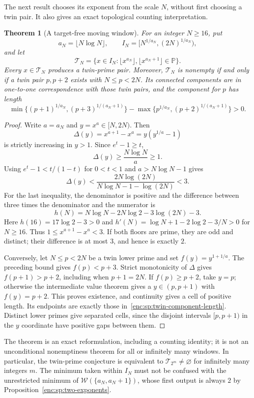 \documentclass[11pt,a4paper]{article}
\newtheorem{theorem}{Theorem}[section]
\theoremstyle{definition}
\theoremstyle{remark}
\numberwithin{equation}{section}
\begin{document}
The next result chooses its exponent from the scale $N$, without first
choosing a twin pair. It also gives an exact topological counting
interpretation.
\begin{theorem}[A target-free moving window]\label{enc:sp:moving-window}
For an integer $N\ge16$, put
\[
 a_N=\lfloor N\log N\rfloor,\qquad
 I_N=[N^{1/a_N},(2N)^{1/a_N}),
\]
and let
\[
 \mathcal T_N=\{x\in I_N:\lfloor x^{a_N}\rfloor,
                         \lfloor x^{a_N+1}\rfloor\in\mathbb P\}.
\]
Every $x\in\mathcal T_N$ produces a twin-prime pair. Moreover,
$\mathcal T_N$ is nonempty if and only if a twin pair $p,p+2$ exists with
$N\le p<2N$. Its connected components are in one-to-one correspondence
with those twin pairs, and the component for $p$ has length
\begin{equation}\label{enc:sp:twin-component-length}
 \min\{(p+1)^{1/a_N},(p+3)^{1/(a_N+1)}\}
 -\max\{p^{1/a_N},(p+2)^{1/(a_N+1)}\}>0.
\end{equation}
\end{theorem}
\begin{proof}
Write $a=a_N$ and $y=x^a\in[N,2N)$. Then
\[
 \Delta(y)=x^{a+1}-x^a=y(y^{1/a}-1)
\]
is strictly increasing in $y>1$. Since $e^t-1\ge t$,
\[
 \Delta(y)\ge\frac{N\log N}{a}\ge1.
\]
Using $e^t-1<t/(1-t)$ for $0<t<1$ and $a>N\log N-1$ gives
\[
 \Delta(y)<
 \frac{2N\log(2N)}{N\log N-1-\log(2N)}<3.
\]
For the last inequality, the denominator is positive and the difference
between three times the denominator and the numerator is
\[
 h(N)=N\log N-2N\log2-3\log(2N)-3.
\]
Here $h(16)=17\log2-3>0$ and
$h'(N)=\log N+1-2\log2-3/N>0$ for $N\ge16$.
Thus $1\le x^{a+1}-x^a<3$. If both floors are prime, they are odd and
distinct; their difference is at most $3$, and hence is exactly $2$.

Conversely, let $N\le p<2N$ be a twin lower prime and set
$f(y)=y^{1+1/a}$. The preceding bound gives $f(p)<p+3$.
Strict monotonicity of $\Delta$ gives
$f(p+1)>p+2$, including when $p+1=2N$. If $f(p)\ge p+2$, take $y=p$;
otherwise the intermediate value theorem gives a
$y\in(p,p+1)$ with $f(y)=p+2$.
This proves existence, and continuity gives a cell of positive length.
Its endpoints are exactly those in~\eqref{enc:sp:twin-component-length}.
Distinct lower primes give separated cells, since the disjoint intervals
$[p,p+1)$ in the $y$ coordinate have positive gaps between them.
\end{proof}

The theorem is an exact reformulation, including a counting identity;
it is not an unconditional nonemptiness theorem for all or infinitely
many windows. In particular, the twin-prime conjecture is equivalent to
$\mathcal T_{2^m}\ne\varnothing$ for infinitely many integers $m$.
The minimum taken within $I_N$ must not be confused with the unrestricted
minimum of $\mathcal W(\{a_N,a_N+1\})$, whose first output is always $2$
by Proposition~\ref{enc:sp:two-exponents}.
\end{document}
